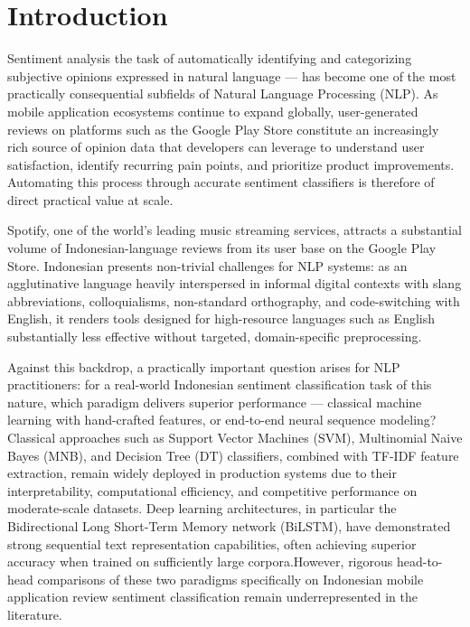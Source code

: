 \documentclass{article}
\begin{document}
\section{Introduction}
\label{sec:intro}

Sentiment analysis the task of automatically identifying and categorizing subjective opinions expressed in natural language --- has become one of the most practically consequential subfields of Natural Language Processing (NLP). As mobile application ecosystems continue to expand globally, user-generated reviews on platforms such as the Google Play Store constitute an increasingly rich source of opinion data that developers can leverage to understand user satisfaction, identify recurring pain points, and prioritize product improvements. Automating this process through accurate sentiment classifiers is therefore of direct practical value at scale.

Spotify, one of the world's leading music streaming services, attracts a substantial volume of Indonesian-language reviews from its user base on the Google Play Store. Indonesian presents non-trivial challenges for NLP systems: as an agglutinative language heavily interspersed in informal digital contexts with slang abbreviations, colloquialisms, non-standard orthography, and code-switching with English, it renders tools designed for high-resource languages such as English substantially less effective without targeted, domain-specific preprocessing.

Against this backdrop, a practically important question arises for NLP practitioners: for a real-world Indonesian sentiment classification task of this nature, which paradigm delivers superior performance --- classical machine learning with hand-crafted features, or end-to-end neural sequence modeling? Classical approaches such as Support Vector Machines (SVM), Multinomial Naive Bayes (MNB), and Decision Tree (DT) classifiers, combined with TF-IDF feature extraction, remain widely deployed in production systems due to their interpretability, computational efficiency, and competitive performance on moderate-scale datasets. Deep learning architectures, in particular the Bidirectional Long Short-Term Memory network (BiLSTM), have demonstrated strong sequential text representation capabilities, often achieving superior accuracy when trained on sufficiently large corpora.However, rigorous head-to-head comparisons of these two paradigms specifically on Indonesian mobile application review sentiment classification remain underrepresented in the literature.
\end{document}
